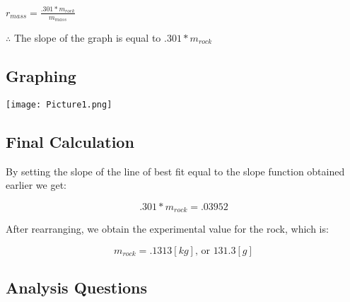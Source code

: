 \documentclass[12pt]{article}
\begin{document}
\begin{center}
    
\Large $r_{mass} = \frac{.301 * m_{rock}}{m_{mass}}$
    
\end{center}

\begin{justify}

$\therefore$ The slope of the graph is equal to $.301 * m_{rock}$

\end{justify}

\begin{center}
    
\section{Graphing}

\texttt{[image: Picture1.png]}

\end{center}

\begin{center}

\section{Final Calculation}

\end{center}

\begin{justify}

By setting the slope of the line of best fit equal to the slope function obtained earlier we get:

\end{justify}

$$.301 * m_{rock} = .03952$$
    
\begin{justify}

After rearranging, we obtain the experimental value for the rock, which is:

\end{justify}

$$m_{rock} = .1313[kg]\text{, or }131.3[g]$$

\begin{center}
    

\section{Analysis Questions}

\end{center}
\end{document}
